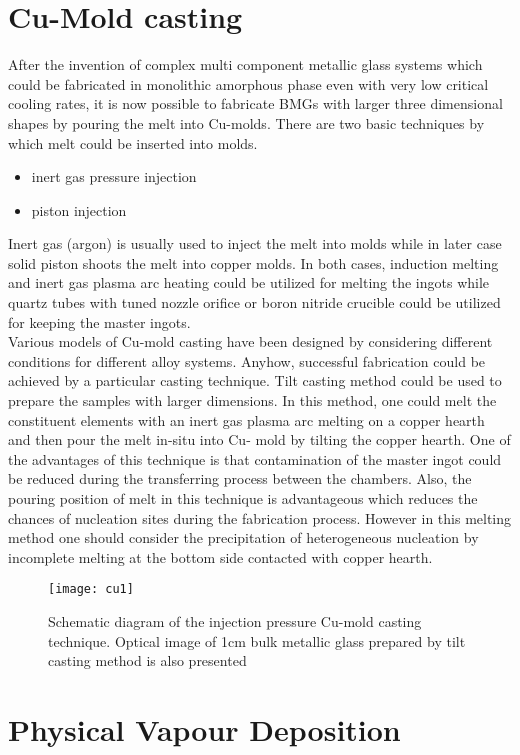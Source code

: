 \section{Cu-Mold casting} 
After the invention of complex multi component metallic glass systems which could be fabricated in monolithic amorphous phase even with very low critical cooling rates, it is now possible to fabricate BMGs with larger three dimensional shapes by pouring the melt into Cu-molds. There are two basic techniques by which melt could be inserted into molds. 
\begin{itemize}
  \item inert gas pressure injection
  \item piston injection
\end{itemize} 
Inert gas (argon) is usually used to inject the melt into molds while in later case solid piston shoots the melt into copper molds. In both cases, induction melting and inert gas plasma arc heating could be utilized for melting the ingots while quartz tubes with tuned nozzle orifice or boron nitride crucible could be utilized for keeping the master ingots. 
\\Various models of Cu-mold casting have been designed by considering different conditions for different alloy systems. Anyhow, successful fabrication could be achieved by a particular casting technique. Tilt casting method could be used to prepare the samples with larger dimensions. In this method, one could melt the constituent elements with an inert gas plasma arc melting on a copper hearth and then pour the melt in-situ into Cu- mold by tilting the copper hearth. One of the advantages of this technique is that contamination of the master ingot could be reduced during the transferring process between the chambers. Also, the pouring position of melt in this technique is advantageous which reduces the chances of nucleation sites during the fabrication process. However in this melting method one should consider the precipitation of heterogeneous nucleation by incomplete melting at the bottom side contacted with copper hearth. 

\begin{figure}[h]
\centering
\texttt{[image: cu1]}
\caption{Schematic diagram of the injection pressure Cu-mold casting technique. Optical image of 1cm bulk metallic glass prepared by tilt casting method is also presented}
\end{figure}

\section{Physical Vapour Deposition}

